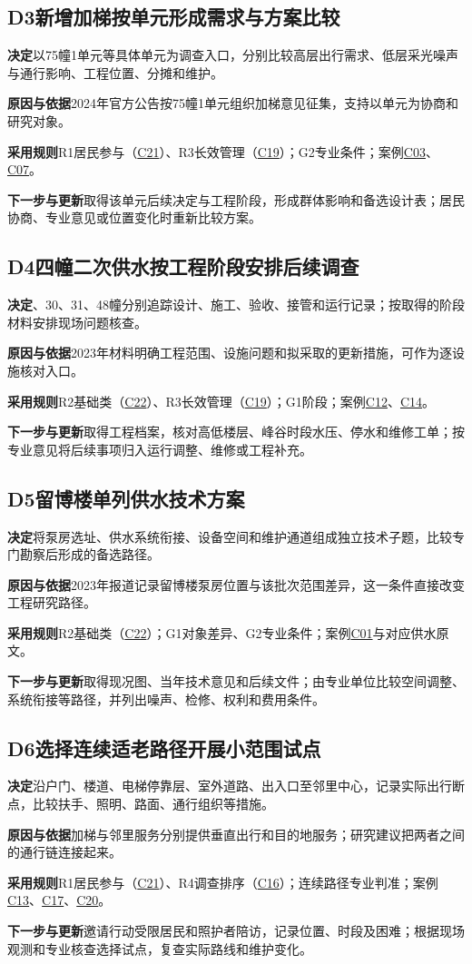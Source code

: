 \documentclass[UTF8,11pt,fontset=windows]{ctexart}
\newcommand{\field}[2]{\par\noindent\textbf{#1}\quad #2\par}
\newcommand{\decision}[2]{\Needspace{7\baselineskip}\subsection*{#1\quad #2}}
\begin{document}
\decision{D3}{新增加梯按单元形成需求与方案比较}
\field{决定}{以75幢1单元等具体单元为调查入口，分别比较高层出行需求、低层采光噪声与通行影响、工程位置、分摊和维护。}
\field{原因与依据}{2024年官方公告按75幢1单元组织加梯意见征集，支持以单元为协商和研究对象。\cite{elevator}}
\field{采用规则}{R1居民参与（\hyperlink{EXP-c48118fa-9af5-4f9a-a634-ae276701cc6a}{C21}）、R3长效管理（\hyperlink{EXP-6baff473-93ed-4160-9a93-a0abf3c7b092}{C19}）；G2专业条件；案例\hyperlink{EXP-1f50f306-64e5-4335-be56-5c89531c00f2}{C03}、\hyperlink{EXP-3092f687-50c6-452e-b1d1-5703c250c25e}{C07}。}
\field{下一步与更新}{取得该单元后续决定与工程阶段，形成群体影响和备选设计表；居民协商、专业意见或位置变化时重新比较方案。}

\decision{D4}{四幢二次供水按工程阶段安排后续调查}
\field{决定}{29、30、31、48幢分别追踪设计、施工、验收、接管和运行记录；按取得的阶段材料安排现场问题核查。}
\field{原因与依据}{2023年材料明确工程范围、设施问题和拟采取的更新措施，可作为逐设施核对入口。\cite{water}}
\field{采用规则}{R2基础类（\hyperlink{EXP-e1688c4c-a449-48d4-9d16-38fea3ca845e}{C22}）、R3长效管理（\hyperlink{EXP-6baff473-93ed-4160-9a93-a0abf3c7b092}{C19}）；G1阶段；案例\hyperlink{EXP-89d54bcc-fc1f-4431-be62-7a06bce77e41}{C12}、\hyperlink{EXP-8fb43037-0680-4136-8844-edcb789391f4}{C14}。}
\field{下一步与更新}{取得工程档案，核对高低楼层、峰谷时段水压、停水和维修工单；按专业意见将后续事项归入运行调整、维修或工程补充。}

\decision{D5}{留博楼单列供水技术方案}
\field{决定}{将泵房选址、供水系统衔接、设备空间和维护通道组成独立技术子题，比较专门勘察后形成的备选路径。}
\field{原因与依据}{2023年报道记录留博楼泵房位置与该批次范围差异，这一条件直接改变工程研究路径。\cite{water}}
\field{采用规则}{R2基础类（\hyperlink{EXP-e1688c4c-a449-48d4-9d16-38fea3ca845e}{C22}）；G1对象差异、G2专业条件；案例\hyperlink{EXP-16120dfe-9d94-4394-8880-494b385cf2d2}{C01}与对应供水原文。}
\field{下一步与更新}{取得现况图、当年技术意见和后续文件；由专业单位比较空间调整、系统衔接等路径，并列出噪声、检修、权利和费用条件。}

\decision{D6}{选择连续适老路径开展小范围试点}
\field{决定}{沿户门、楼道、电梯停靠层、室外道路、出入口至邻里中心，记录实际出行断点，比较扶手、照明、路面、通行组织等措施。}
\field{原因与依据}{加梯与邻里服务分别提供垂直出行和目的地服务；研究建议把两者之间的通行链连接起来。\cite{trust,neighbor}}
\field{采用规则}{R1居民参与（\hyperlink{EXP-c48118fa-9af5-4f9a-a634-ae276701cc6a}{C21}）、R4调查排序（\hyperlink{EXP-2c88cc20-e2d3-4a32-a176-e48d753a4712}{C16}）；连续路径专业判准；案例\hyperlink{EXP-8ab942a8-bdac-4075-97da-46b09ee9aa41}{C13}、\hyperlink{EXP-4fb5ae8b-4f8c-4b38-9f15-7fd612098a66}{C17}、\hyperlink{EXP-825f931a-a8d3-49c2-9c42-e73bea9922e6}{C20}。}
\field{下一步与更新}{邀请行动受限居民和照护者陪访，记录位置、时段及困难；根据现场观测和专业核查选择试点，复查实际路线和维护变化。}
\end{document}
